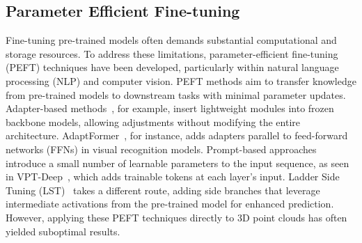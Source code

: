 \subsection{Parameter Efficient Fine-tuning}
Fine-tuning pre-trained models often demands substantial computational and storage resources. To address these limitations, parameter-efficient fine-tuning (PEFT) techniques have been developed, particularly within natural language processing (NLP) and computer vision. PEFT methods aim to transfer knowledge from pre-trained models to downstream tasks with minimal parameter updates. Adapter-based methods~\cite{houlsby2019parameter, hu2021lora, chen2022adaptformer}, for example, insert lightweight modules into frozen backbone models, allowing adjustments without modifying the entire architecture. AdaptFormer~\cite{chen2022adaptformer}, for instance, adds adapters parallel to feed-forward networks (FFNs) in visual recognition models. Prompt-based approaches~\cite{li2021prefix, jia2022visual} introduce a small number of learnable parameters to the input sequence, as seen in VPT-Deep~\cite{jia2022visual}, which adds trainable tokens at each layer’s input. Ladder Side Tuning (LST)~\cite{sung2022lst} takes a different route, adding side branches that leverage intermediate activations from the pre-trained model for enhanced prediction. However, applying these PEFT techniques directly to 3D point clouds has often yielded suboptimal results.

